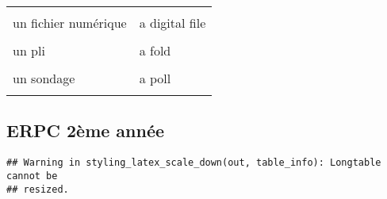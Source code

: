 \documentclass[
  10pt,
]{article}
\begin{document}
\begin{longtable}{ll}
\cellcolor{gray!6}{un exemplaire} & \cellcolor{gray!6}{a copy}\\

un fichier numérique & a digital file\\

\cellcolor{gray!6}{un massicot} & \cellcolor{gray!6}{a trimmer}\\

un pli & a fold\\

\cellcolor{gray!6}{un rouleau} & \cellcolor{gray!6}{a roller}\\

un sondage & a poll\\

\cellcolor{gray!6}{un stage} & \cellcolor{gray!6}{an internship}\\
\bottomrule
\end{longtable}

\hypertarget{erpc-2uxe8me-annuxe9e}{%
\subsection{ERPC 2ème année}\label{erpc-2uxe8me-annuxe9e}}

\begin{verbatim}
## Warning in styling_latex_scale_down(out, table_info): Longtable cannot be
## resized.
\end{verbatim}
\end{document}
